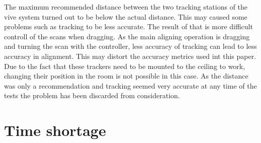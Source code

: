\documentclass[hyperref,english,bachelorofscience,bibnum]{cgvpub}
\begin{document}

The maximum recommended distance between the two tracking stations of the vive system turned out to be below the actual distance. This may caused some problems such as tracking to be less accurate. The result of that is more difficult controll of the scans when dragging. As the main aligning operation is dragging and turning the scan with the controller, less accuracy of tracking can lead to less accuracy in alignment. This may distort the accuracy metrics used int this paper. Due to the fact that these trackers need to be mounted to the ceiling to work, changing their position in the room is not possible in this case. As the distance was only a recommendation and tracking seemed very accurate at any time of the tests the problem has been discarded from consideration.

\section{Time shortage}
\end{document}
